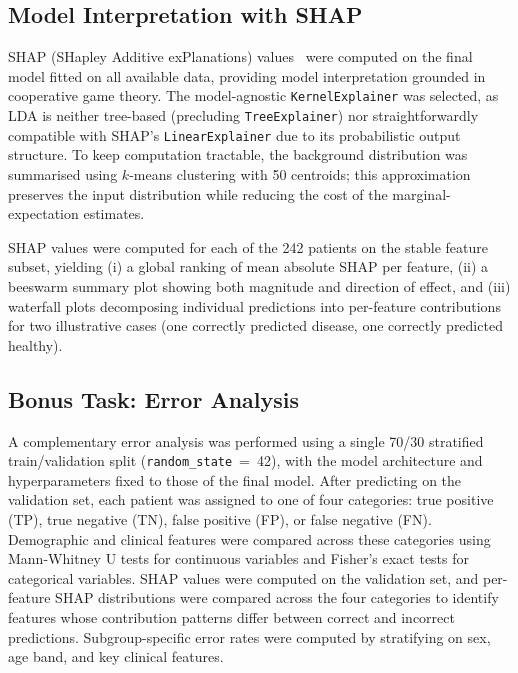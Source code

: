\subsection{Model Interpretation with SHAP}
\label{sec:shap}

SHAP (SHapley Additive exPlanations) values~\cite{lundberg2017unified} were computed on the final model fitted on all available data, providing model interpretation grounded in cooperative game theory. The model-agnostic \texttt{KernelExplainer} was selected, as LDA is neither tree-based (precluding \texttt{TreeExplainer}) nor straightforwardly compatible with SHAP's \texttt{LinearExplainer} due to its probabilistic output structure. To keep computation tractable, the background distribution was summarised using $k$-means clustering with 50 centroids; this approximation preserves the input distribution while reducing the cost of the marginal-expectation estimates.

SHAP values were computed for each of the 242 patients on the stable feature subset, yielding (i) a global ranking of mean absolute SHAP per feature, (ii) a beeswarm summary plot showing both magnitude and direction of effect, and (iii) waterfall plots decomposing individual predictions into per-feature contributions for two illustrative cases (one correctly predicted disease, one correctly predicted healthy).

\subsection{Bonus Task: Error Analysis}
\label{sec:bonus_methods}

A complementary error analysis was performed using a single 70/30 stratified train/validation split (\texttt{random\_state}~=~42), with the model architecture and hyperparameters fixed to those of the final model. After predicting on the validation set, each patient was assigned to one of four categories: true positive (TP), true negative (TN), false positive (FP), or false negative (FN). Demographic and clinical features were compared across these categories using Mann-Whitney U tests for continuous variables and Fisher's exact tests for categorical variables. SHAP values were computed on the validation set, and per-feature SHAP distributions were compared across the four categories to identify features whose contribution patterns differ between correct and incorrect predictions. Subgroup-specific error rates were computed by stratifying on sex, age band, and key clinical features.

